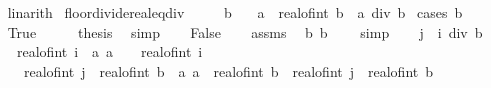 \begin{isabellebody}
%
\isadelimproof
\ \ %
\endisadelimproof
%
\isatagproof
{}\isamarkupfalse%
\ linarith%
\endisatagproof
{\isafoldproof}%
%
\isadelimproof
\isanewline
%
\endisadelimproof
\isanewline
{}\isamarkupfalse%
\ floor{\isacharunderscore}{\kern0pt}divide{\isacharunderscore}{\kern0pt}real{\isacharunderscore}{\kern0pt}eq{\isacharunderscore}{\kern0pt}div{\isacharcolon}{\kern0pt}\isanewline
\ \ \ {\isachardoublequoteopen}{}\ {\isasymle}\ b{\isachardoublequoteclose}\isanewline
\ \ \ {\isachardoublequoteopen}{\isasymlfloor}a\ {\isacharslash}{\kern0pt}\ real{\isacharunderscore}{\kern0pt}of{\isacharunderscore}{\kern0pt}int\ b{\isasymrfloor}\ {\isacharequal}{\kern0pt}\ {\isasymlfloor}a{\isasymrfloor}\ div\ b{\isachardoublequoteclose}\isanewline
%
\isadelimproof
%
\endisadelimproof
%
\isatagproof
{}\isamarkupfalse%
\ {\isacharparenleft}{\kern0pt}cases\ {\isachardoublequoteopen}b\ {\isacharequal}{\kern0pt}\ {}{\isachardoublequoteclose}{\isacharparenright}{\kern0pt}\isanewline
\ \ \isamarkupfalse%
\ True\isanewline
\ \ \isamarkupfalse%
\ \isamarkupfalse%
\ {\isacharquery}{\kern0pt}thesis\ \isamarkupfalse%
\ simp\isanewline
{}\isamarkupfalse%
\isanewline
\ \ \isamarkupfalse%
\ False\isanewline
\ \ \isamarkupfalse%
\ assms\ \isamarkupfalse%
\ b{\isacharcolon}{\kern0pt}\ {\isachardoublequoteopen}b\ {\isachargreater}{\kern0pt}\ {}{\isachardoublequoteclose}\ \isamarkupfalse%
\ simp\isanewline
\ \ \isamarkupfalse%
\ {\isachardoublequoteopen}j\ {\isacharequal}{\kern0pt}\ i\ div\ b{\isachardoublequoteclose}\isanewline
\ \ \ \ \ {\isachardoublequoteopen}real{\isacharunderscore}{\kern0pt}of{\isacharunderscore}{\kern0pt}int\ i\ {\isasymle}\ a{\isachardoublequoteclose}\ {\isachardoublequoteopen}a\ {\isacharless}{\kern0pt}\ {}\ {\isacharplus}{\kern0pt}\ real{\isacharunderscore}{\kern0pt}of{\isacharunderscore}{\kern0pt}int\ i{\isachardoublequoteclose}\isanewline
\ \ \ \ \ \ {\isachardoublequoteopen}real{\isacharunderscore}{\kern0pt}of{\isacharunderscore}{\kern0pt}int\ j\ {\isacharasterisk}{\kern0pt}\ real{\isacharunderscore}{\kern0pt}of{\isacharunderscore}{\kern0pt}int\ b\ {\isasymle}\ a{\isachardoublequoteclose}\ {\isachardoublequoteopen}a\ {\isacharless}{\kern0pt}\ real{\isacharunderscore}{\kern0pt}of{\isacharunderscore}{\kern0pt}int\ b\ {\isacharplus}{\kern0pt}\ real{\isacharunderscore}{\kern0pt}of{\isacharunderscore}{\kern0pt}int\ j\ {\isacharasterisk}{\kern0pt}\ real{\isacharunderscore}{\kern0pt}of{\isacharunderscore}{\kern0pt}int\ b{\isachardoublequoteclose}\isanewline

\end{isabellebody}
